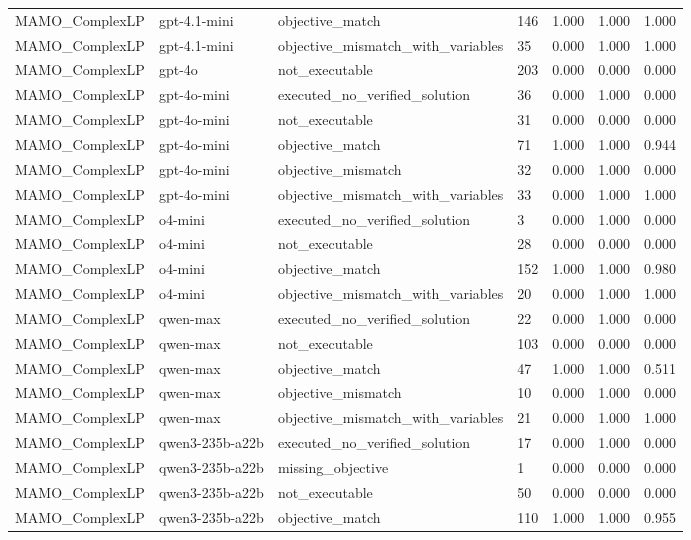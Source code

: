 \begin{table}[t]
\begin{tabular}{lllllll}
MAMO\_ComplexLP & gpt-4.1-mini & objective\_match & 146 & 1.000 & 1.000 & 1.000 \\
MAMO\_ComplexLP & gpt-4.1-mini & objective\_mismatch\_with\_variables & 35 & 0.000 & 1.000 & 1.000 \\
MAMO\_ComplexLP & gpt-4o & not\_executable & 203 & 0.000 & 0.000 & 0.000 \\
MAMO\_ComplexLP & gpt-4o-mini & executed\_no\_verified\_solution & 36 & 0.000 & 1.000 & 0.000 \\
MAMO\_ComplexLP & gpt-4o-mini & not\_executable & 31 & 0.000 & 0.000 & 0.000 \\
MAMO\_ComplexLP & gpt-4o-mini & objective\_match & 71 & 1.000 & 1.000 & 0.944 \\
MAMO\_ComplexLP & gpt-4o-mini & objective\_mismatch & 32 & 0.000 & 1.000 & 0.000 \\
MAMO\_ComplexLP & gpt-4o-mini & objective\_mismatch\_with\_variables & 33 & 0.000 & 1.000 & 1.000 \\
MAMO\_ComplexLP & o4-mini & executed\_no\_verified\_solution & 3 & 0.000 & 1.000 & 0.000 \\
MAMO\_ComplexLP & o4-mini & not\_executable & 28 & 0.000 & 0.000 & 0.000 \\
MAMO\_ComplexLP & o4-mini & objective\_match & 152 & 1.000 & 1.000 & 0.980 \\
MAMO\_ComplexLP & o4-mini & objective\_mismatch\_with\_variables & 20 & 0.000 & 1.000 & 1.000 \\
MAMO\_ComplexLP & qwen-max & executed\_no\_verified\_solution & 22 & 0.000 & 1.000 & 0.000 \\
MAMO\_ComplexLP & qwen-max & not\_executable & 103 & 0.000 & 0.000 & 0.000 \\
MAMO\_ComplexLP & qwen-max & objective\_match & 47 & 1.000 & 1.000 & 0.511 \\
MAMO\_ComplexLP & qwen-max & objective\_mismatch & 10 & 0.000 & 1.000 & 0.000 \\
MAMO\_ComplexLP & qwen-max & objective\_mismatch\_with\_variables & 21 & 0.000 & 1.000 & 1.000 \\
MAMO\_ComplexLP & qwen3-235b-a22b & executed\_no\_verified\_solution & 17 & 0.000 & 1.000 & 0.000 \\
MAMO\_ComplexLP & qwen3-235b-a22b & missing\_objective & 1 & 0.000 & 0.000 & 0.000 \\
MAMO\_ComplexLP & qwen3-235b-a22b & not\_executable & 50 & 0.000 & 0.000 & 0.000 \\
MAMO\_ComplexLP & qwen3-235b-a22b & objective\_match & 110 & 1.000 & 1.000 & 0.955 \\

\end{tabular}
\end{table}
